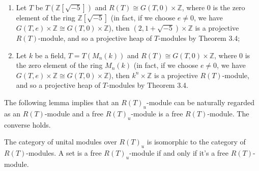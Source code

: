\documentclass[11pt, twoside]{article}
\begin{document}
\begin{example}
\begin{enumerate}
    \item[(i)] Let $T$ be $T(\mathbb{Z}[\sqrt{-5}])$ and $R(T) \cong G(T,0) \times \mathbb{Z}$, where $0$ is the zero element of the ring $\mathbb{Z}[\sqrt{-5}]$ (in fact, if we choose $e\neq 0$, we have $G(T,e) \times \mathbb{Z} \cong G(T,0) \times \mathbb{Z}$), then $(2,1+\sqrt{-5}) \times \mathbb{Z}$ is a projective $R(T)$-module, and so a projective heap of $T$-modules by Theorem 3.4;
    \item[(ii)] Let $k$ be a field, $T = T(M_n(k))$ and $R(T) \cong G(T,0) \times \mathbb{Z}$, where $0$ is the zero element of the ring $M_n(k)$ (in fact, if we choose $e\neq 0$, we have $G(T,e) \times \mathbb{Z} \cong G(T,0) \times \mathbb{Z}$), then $k^n \times \mathbb{Z}$ is a projective $R(T)$-module, and so a projective heap of $T$-modules by Theorem 3.4.
\end{enumerate}

\end{example}
The following lemma implies that an $R(T)_u$-module can be naturally regarded as an $R(T)$-module and a free $R(T)_u$-module is a free $R(T)$-module. The converse holds.
\begin{lemma}
The category of unital modules over $R(T)_u$ is isomorphic to the category of $R(T)$-modules. A set is a free $R(T)_u$-module if and only if it's a free $R(T)$-module.
\end{lemma}
\end{document}
